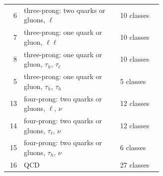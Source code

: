 \begin{table}[p]
\begin{tabular}{r p{0.62\linewidth} l}
6 & three-prong: two quarks or gluons, $\ell$ & 10 classes \\
7 & three-prong: one quark or gluon, $\ell\ell$ & 10 classes \\
8 & three-prong: one quark or gluon, $\tau_h$, $\tau_\ell$ & 10 classes \\
5 & three-prong: one quark or gluon, $\tau_h$, $\tau_h$ & 5 classes \\
13 & four-prong: two quarks or gluons, $\ell$, $\nu$ & 12 classes \\
14 & four-prong: two quarks or gluons, $\tau_\ell$, $\nu$ & 12 classes \\
15 & four-prong: two quarks or gluons, $\tau_h$, $\nu$ & 6 classes \\
16 & QCD & 27 classes \\
\bottomrule
\end{tabular}
\end{table}
